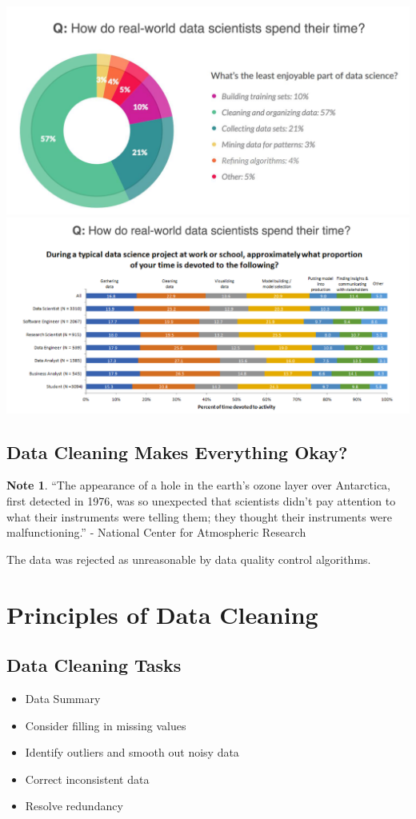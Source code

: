 \documentclass[11pt]{article}
\theoremstyle{definition}
\newtheorem{note}{Note}
\begin{document}
\includegraphics[width=\textwidth]{4.png}
\includegraphics[width=\textwidth]{5.png}
\subsection{Data Cleaning Makes Everything Okay?}
\begin{note}
    “The appearance of a hole in the
earth's ozone layer over
Antarctica, first detected in 1976,
was so unexpected that scientists
didn't pay attention to what their
instruments were telling them;
they thought their instruments
were malfunctioning.”
- National Center for
Atmospheric Research
\end{note}
The data was rejected as unreasonable by data quality control algorithms.
\section{Principles of Data Cleaning}
\subsection{Data Cleaning Tasks}
\begin{itemize}
    \item Data Summary
    \item Consider filling in missing values
    \item Identify outliers and smooth out noisy data
    \item Correct inconsistent data
    \item Resolve redundancy
\end{itemize}
\end{document}
